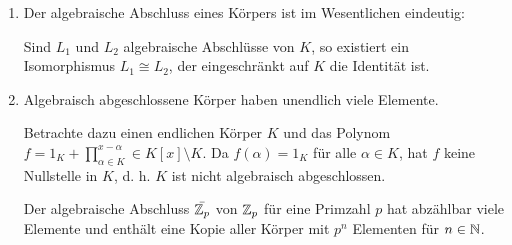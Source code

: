 \begin{rem}\label{rem8_4}
	\begin{enumerate}[label=(\roman*)]
		\item Der algebraische Abschluss eines Körpers ist im Wesentlichen eindeutig:
		
		Sind $L_1$ und $L_2$ algebraische Abschlüsse von $K$, so existiert ein Isomorphismus $L_1 \cong L_2$, der eingeschränkt auf $K$ die Identität ist.
		\item Algebraisch abgeschlossene Körper haben unendlich viele Elemente.
		\begin{inlproof}
			Betrachte dazu einen endlichen Körper $K$ und das Polynom $f = 1_K + \prod_{\alpha \in K}^{x - \alpha} \in K[x] \setminus K$. Da $f(\alpha) = 1_K$ für alle $\alpha \in K$, hat $f$ keine Nullstelle in $K$, d. h. $K$ ist nicht algebraisch abgeschlossen.
		\end{inlproof}
		Der algebraische Abschluss $\bar{\mathbb{Z}_p}$ von $\mathbb{Z}_p$ für eine Primzahl $p$ hat abzählbar viele Elemente und enthält eine Kopie aller Körper mit $p^n$ Elementen für $n \in \mathbb{N}$.
	\end{enumerate}
\end{rem}